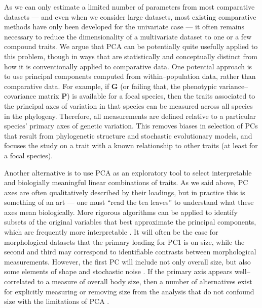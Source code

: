 \documentclass[a4paper,12pt]{article}
\begin{document}
As we can only estimate a limited number of parameters from most comparative datasets --- and even when we consider large datasets, most existing comparative methods have only been developed for the univariate case --- it often remains necessary to reduce the dimensionality of a multivariate dataset to one or a few compound traits. We argue that PCA can be potentially quite usefully applied to this problem, though in ways that are statistically and conceptually distinct from how it is conventionally applied to comparative data. One potential approach is to use principal components computed from within--population data, rather than comparative data. For example, if $\mathbf{G}$ (or failing that, the phenotypic variance--covariance matrix $\mathbf{P}$) is available for a focal species, then the traits associated to the principal axes of variation in that species can be measured across all species in the phylogeny. Therefore, all measurements are defined relative to a particular species' primary axes of genetic variation. This removes biases in selection of PCs that result from phylogenetic structure and stochastic evolutionary models, and focuses the study on a trait with a known relationship to other traits (at least for a focal species). 

Another alternative is to use PCA as an exploratory tool to select interpretable and biologially meaningful linear combinations of traits. As we said above, PC axes are often qualitatively described by their loadings, but in practice this is something of an art --- one must ``read the tea leaves'' to understand what these axes mean biologically. More rigorous algorithms can be applied to identify subsets of the original variables that best approximate the principal components, which are frequently more interpretable \citep{Cadima2001}. It will often be the case for morphological datasets that the primary loading for PC1 is on size, while the second and third may correspond to identifiable contrasts between morphological measurements. However, the first PC will include not only overall size, but also some elements of shape and stochastic noise \citep{Somers1986, Somers1989}. If the primary axis appears well--correlated to a measure of overall body size, then a number of alternatives exist for explicitly measuring or removing size from the analysis that do not confound size with the limitations of PCA \citep{Somers1989}. 
\end{document}
